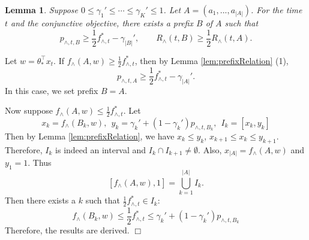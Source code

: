 \documentclass{article}
\newcommand{\abs}[1]{\left| #1 \right|}
\newtheorem{lemma}[theorem]{Lemma}%
\newenvironment{proof}{\noindent {\textbf{Proof. }}}{$\Box$ \medskip}
\begin{document}
\begin{lemma} \label{lem:prefixexists}
Suppose $0 \leq \gamma_1' \leq \cdots \leq \gamma_K' \leq 1$. Let $A = (a_1, ..., a_{\abs{A}})$. For the time $t$ and the conjunctive objective, there exists a prefix $B$ of $A$ such that 
$$
p_{\wedge, t, B} \geq \frac{1}{2}f_{\wedge, t}^{\ast} - \gamma_{\abs{B}}', \qquad R_{\wedge}(t, B) \geq \frac{1}{2} R_{\wedge}(t, A).
$$ 
\end{lemma}
\begin{proof}
Let $w= \theta_*^{\top} x_t$.
If $f_{\wedge}(A, w) \geq \frac{1}{2} f_{\wedge, t}^{\ast}$, then by Lemma \ref{lem:prefixRelation} (1),
$$
p_{\wedge, t, A} \geq \frac{1}{2}f_{\wedge, t}^{\ast} - \gamma_{\abs{A}}'.
$$
In this case, we set prefix $B = A$.

Now suppose $f_{\wedge}(A, w) \leq \frac{1}{2} f_{\wedge, t}^{\ast}$. Let
$$
x_k = f_{\wedge}(B_k,w), ~~ y_k = \gamma_k' + (1 - \gamma_k')p_{\wedge, t,B_k}, ~~I_k = [x_k, y_k]
$$
Then by Lemma \ref{lem:prefixRelation}, we have $x_k \leq y_k$, $x_{k+1} \leq x_k \leq y_{k+1}$. Therefore, $I_k$ is indeed an interval and $I_k \cap I_{k+1} \neq \emptyset$. Also, $x_{\abs{A}} = f_{\wedge}(A, w)$ and $y_1 = 1$. Thus
$$
[f_{\wedge}(A,w), 1] = \bigcup_{k=1}^{\abs{A}} I_k.
$$
Then there exists a $k$ such that $\frac{1}{2}f_{\wedge, t}^{\ast} \in I_k$:
$$
f_{\wedge}(B_k,w) \leq \frac{1}{2}f_{\wedge, t}^{\ast} \leq \gamma_k' + (1 - \gamma_k')p_{\wedge, t, B_k}
$$
Therefore, the results are derived.
\end{proof}
\end{document}
